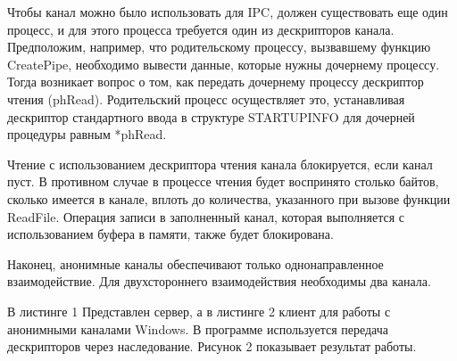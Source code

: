 \documentclass[a4paper,12pt]{article} %
\begin{document}
Чтобы канал можно было использовать для IPC, должен существовать еще один процесс, и для этого процесса требуется один из дескрипторов канала. Предположим, например, что родительскому процессу, вызвавшему функцию CreatePipe, необходимо вывести данные, которые нужны дочернему процессу. Тогда возникает вопрос о том, как передать дочернему процессу дескриптор чтения (phRead). Родительский процесс осуществляет это, устанавливая дескриптор стандартного ввода в структуре STARTUPINFO для дочерней процедуры равным *phRead.

Чтение с использованием дескриптора чтения канала блокируется, если канал пуст. В противном случае в процессе чтения будет воспринято столько байтов, сколько имеется в канале, вплоть до количества, указанного при вызове функции ReadFile. Операция записи в заполненный канал, которая выполняется с использованием буфера в памяти, также будет блокирована.

Наконец, анонимные каналы обеспечивают только однонаправленное взаимодействие. Для двухстороннего взаимодействия необходимы два канала.

В листинге 1 Представлен сервер, а в листинге 2 клиент для работы с анонимными каналами Windows. В программе используется передача дескрипторов через наследование. Рисунок 2 показывает результат работы.
\end{document}
